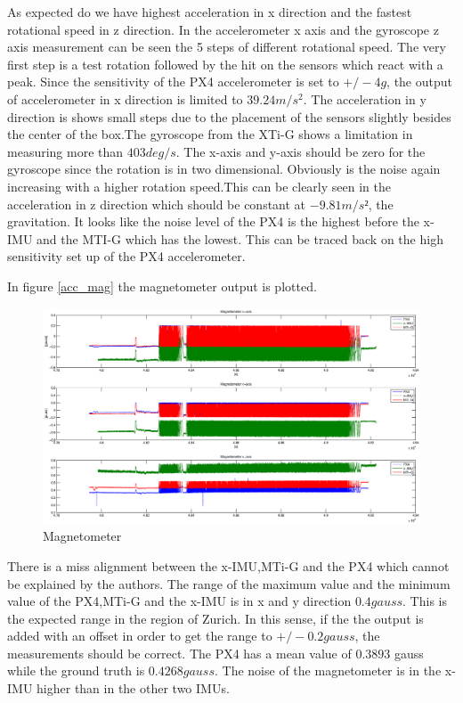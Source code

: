 As expected do we have highest acceleration in x direction and the fastest rotational speed in z direction. In the accelerometer x axis and the gyroscope z axis measurement can be seen the 5 steps of different rotational speed. The very first step is a test rotation followed by the hit on the sensors which react with a peak. Since the sensitivity of the PX4 accelerometer is set to $+/- 4 g$, the output of accelerometer in x direction is limited to $39.24 m/s^2$. The acceleration in y direction is shows small steps due to the placement of the sensors slightly besides the center of the box.The gyroscope from the XTi-G shows a limitation in measuring more than $ 403 deg/s$. The x-axis and y-axis should be zero for the gyroscope since the rotation is in two dimensional. Obviously  is the noise again increasing with a higher rotation speed.This can be clearly seen in the acceleration in z direction which should be constant at $-9.81 m/s²$, the gravitation. It looks like the noise level of the PX4 is the highest before the x-IMU and the MTI-G which has the lowest. This can be traced back on the high sensitivity set up of the PX4 accelerometer.


In figure \ref{acc_mag} the magnetometer output is plotted.
\begin{figure}[h]
\includegraphics[width=1.2\textwidth]{pictures/ct_mag.eps}
\caption{Magnetometer}
\label{ct_mag}
\end{figure}
 There is a miss alignment between the x-IMU,MTi-G and the PX4 which cannot be explained by the authors. The range of the maximum value and the minimum value of the PX4,MTi-G and the x-IMU is in x and y direction $0.4 gauss$. This is the expected range in the region of Zurich. In this sense, if the the output is added with an offset in order to get the range to $+/- 0.2 gauss$, the measurements should be correct. The PX4 has a mean value of $0.3893$ gauss while the ground truth is $0.4268 gauss$.  The noise of the magnetometer is in the x-IMU higher than in the other two IMUs.

